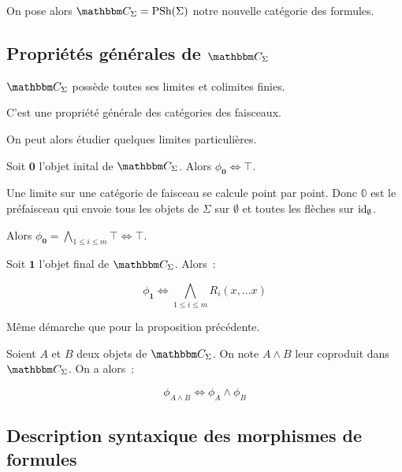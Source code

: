 On pose alors $\C_\Sigma = \psh(\Sigma)$ notre nouvelle catégorie des formules.

\subsection{Propriétés générales de $\C_\Sigma$}

\begin{lem}
    $\C_\Sigma$ possède toutes ses limites et colimites finies.
\end{lem}

\begin{pv}
    C'est une propriété générale des catégories des faisceaux.
\end{pv}

On peut alors étudier quelques limites particulières.

\begin{lem}
    Soit $\mathbf{0}$ l'objet inital de $\C_\Sigma$. Alors $\phi_\mathbf{0}\iff\top$.
\end{lem}

\begin{pv}
    Une limite sur une catégorie de faisceau se calcule point par point. Donc $\mathbb{0}$
    est le préfaisceau qui envoie tous les objets de $\Sigma$ sur $\emptyset$ et toutes
    les flèches sur $\operatorname{id}_\emptyset$.

    Alors $\phi_\mathbf{0} = \bigwedge_{1\leq i\leq m}\top \iff \top$.
\end{pv}

\begin{lem}
    Soit $\mathbf{1}$ l'objet final de $\C_\Sigma$. Alors~:

    \[\phi_\mathbf{1} \iff \bigwedge_{1\leq i\leq m}R_i(x,\dots x)\]
\end{lem}

\begin{pv}
    Même démarche que pour la proposition précédente.
\end{pv}

\begin{lem}
    Soient $A$ et $B$ deux objets de $\C_\Sigma$. On note $A\wedge B$ leur coproduit
    dans $\C_\Sigma$. On a alors~:

    \[\phi_{A\wedge B} \iff \phi_A\wedge\phi_B \]
\end{lem}

\subsection{Description syntaxique des morphismes de formules}

